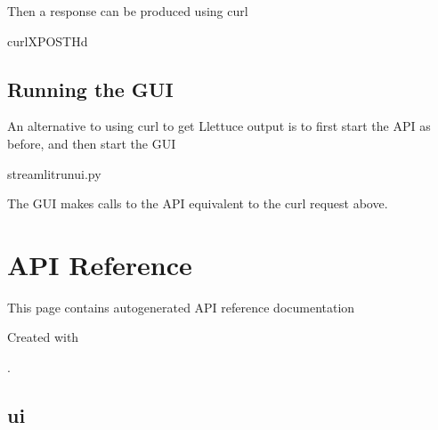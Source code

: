 \documentclass[letterpaper,10pt,english]{sphinxmanual}
\begin{document}
\sphinxAtStartPar
Then a response can be produced using curl

\begin{sphinxVerbatim}[commandchars=\\\{\}]
curl\PYGZhy{}XPOST\PYGZhy{}H\PYGZhy{}d
\end{sphinxVerbatim}


\subsection{Running the GUI}
\label{\detokenize{usage:running-the-gui}}
\sphinxAtStartPar
An alternative to using curl to get Llettuce output is to first start the API as before, and then start the GUI

\begin{sphinxVerbatim}[commandchars=\\\{\}]
streamlitrunui.py
\end{sphinxVerbatim}

\sphinxAtStartPar
The GUI makes calls to the API equivalent to the curl request above.

\sphinxstepscope


\section{API Reference}
\label{\detokenize{autoapi/index:api-reference}}\label{\detokenize{autoapi/index::doc}}
\sphinxAtStartPar
This page contains auto\sphinxhyphen{}generated API reference documentation %
\begin{footnote}[1]\sphinxAtStartFootnote
Created with 
%
\end{footnote}.

\sphinxstepscope


\subsection{ui}
\label{\detokenize{autoapi/ui/index:module-ui}}\label{\detokenize{autoapi/ui/index:ui}}\label{\detokenize{autoapi/ui/index::doc}}
\end{document}
